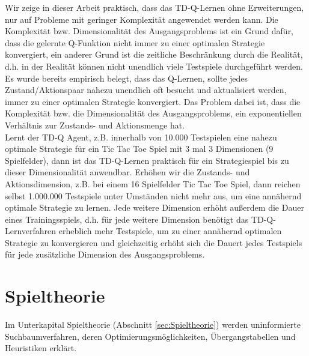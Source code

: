 Wir zeige in dieser Arbeit praktisch, dass das TD-Q-Lernen ohne Erweiterungen, nur auf Probleme mit geringer Komplexität angewendet werden kann. Die Komplexität bzw. Dimensionalität des Ausgangsproblems ist ein Grund dafür, dass die gelernte Q-Funktion nicht immer zu einer optimalen Strategie konvergiert, ein anderer Grund ist die zeitliche Beschränkung durch die Realität, d.h. in der Realität können nicht unendlich viele Testspiele durchgeführt werden. Es wurde bereits empirisch belegt, dass das Q-Lernen, sollte jedes Zustand/Aktionspaar nahezu unendlich oft besucht und aktualisiert werden, immer zu einer optimalen Strategie konvergiert. Das Problem dabei ist, dass die Komplexität bzw. die Dimensionalität des Ausgangsproblems, ein exponentiellen Verhältnis zur Zustands- und Aktionsmenge hat. \\

Lernt der TD-Q Agent, z.B. innerhalb von 10.000 Testspielen eine nahezu optimale Strategie für ein Tic Tac Toe Spiel mit 3 mal 3 Dimensionen (9 Spielfelder), dann ist das TD-Q-Lernen praktisch für ein Strategiespiel bis zu dieser Dimensionalität anwendbar. Erhöhen wir die Zustands- und Aktionsdimension, z.B. bei einem 16 Spielfelder Tic Tac Toe Spiel, dann reichen selbst 1.000.000 Testspiele unter Umständen nicht mehr aus, um eine annähernd optimale Strategie zu lernen. Jede weitere Dimension erhöht außerdem die Dauer eines Trainingsspiels, d.h. für jede weitere Dimension benötigt das TD-Q-Lernverfahren erheblich mehr Testspiele, um zu einer annähernd optimalen Strategie zu konvergieren und gleichzeitig erhöht sich die Dauert jedes Testspiels für jede zusätzliche Dimension des Ausgangsproblems.

\section{Spieltheorie}


Im Unterkapital Spieltheorie (Abschnitt \ref{sec:Spieltheorie}) werden uninformierte Suchbaumverfahren, deren Optimierungsmöglichkeiten, Übergangstabellen und Heuristiken erklärt.\\

